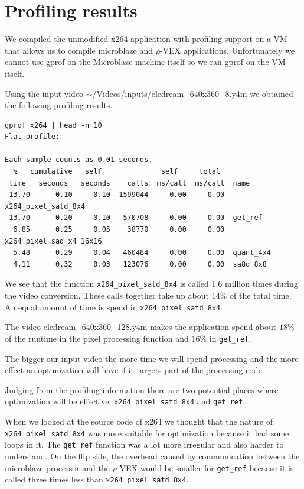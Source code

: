 \documentclass{article}
\newcommand{\rvex}{\ensuremath{\rho}-VEX}
\newcommand{\satd}{\texttt{x264\_pixel\_satd\_8x4}}
\newcommand{\getref}{\texttt{get\_ref}}
\begin{document}
\section{Profiling results}

We compiled the unmodified x264 application with profiling support on a VM that
allows us to compile microblaze and \rvex{} applications. Unfortunately we
cannot use gprof on the Microblaze machine itself so we ran gprof on the VM
itself.

	Using the input video $\sim$/Videos/inputs/eledream\_640x360\_8.y4m we obtained
the following profiling results.

\begin{small}\begin{lstlisting}
gprof x264 | head -n 10
Flat profile:

Each sample counts as 0.01 seconds.
  %   cumulative   self              self     total
 time   seconds   seconds    calls  ms/call  ms/call  name
 13.70      0.10     0.10  1599044     0.00     0.00  x264_pixel_satd_8x4
 13.70      0.20     0.10   570708     0.00     0.00  get_ref
  6.85      0.25     0.05    38770     0.00     0.00  x264_pixel_sad_x4_16x16
  5.48      0.29     0.04   460484     0.00     0.00  quant_4x4
  4.11      0.32     0.03   123076     0.00     0.00  sa8d_8x8
\end{lstlisting}\end{small}

We see that the function \satd{} is called 1.6 million times during the video
conversion. These calls together take up about $14\%$ of the total time. An
equal amount of time is spend in \satd{}.

The video eledream\_640x360\_128.y4m makes the application spend about $18\%$
of the runtime in the pixel processing function and $16\%$ in \getref{}.

The bigger our input video the more time we will spend processing and the more
effect an optimization will have if it targets part of the processing code.

Judging from the profiling information there are two potential places where
optimization will be effective: \satd{} and \getref{}.

When we looked at the source code of x264 we thought that the nature of \satd{}
was more suitable for optimization because it had some loops in it. The
\getref{} function was a lot more irregular and also harder to understand. On
the flip side, the overhead caused by communication between the microblaze
processor and the \rvex{} would be smaller for \getref{} because it is called
three times less than \satd{}.
\end{document}
